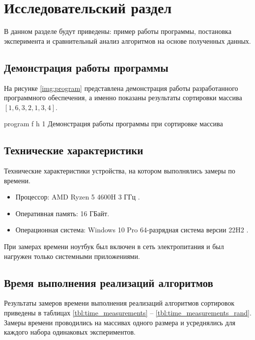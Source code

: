 \chapter{Исследовательский раздел}

В данном разделе будут приведены: пример работы программы, постановка эксперимента и сравнительный анализ алгоритмов на основе полученных данных.

\section{Демонстрация работы программы}


На рисунке \ref{img:program} представлена демонстрация работы разработанного программного обеспечения, а именно показаны результаты сортировки массива $[1, 6, 3, 2, 1, 3, 4]$.  
\clearpage

{program} %
{f} %
{h} %
{1\textwidth} %
{Демонстрация работы программы при сортировке массива} %

\clearpage


\section{Технические характеристики}

Технические характеристики устройства, на котором выполнялись замеры по времени.

\begin{itemize}
	\item Процессор: AMD Ryzen 5 4600H 3 ГГц \cite{amd}.
	\item Оперативная память: 16 ГБайт.
	\item Операционная система: Windows 10 Pro 64-разрядная система версии 22H2 \cite{windows}.
\end{itemize}

При замерах времени ноутбук был включен в сеть электропитания и был нагружен только системными приложениями.

\section{Время выполнения реализаций алгоритмов}

Результаты замеров времени выполнения реализаций алгоритмов сортировок приведены в таблицах \ref{tbl:time_measurements} -- \ref{tbl:time_measurements_rand}.
Замеры времени проводились на массивах одного размера и усреднялись для каждого набора одинаковых экспериментов.

